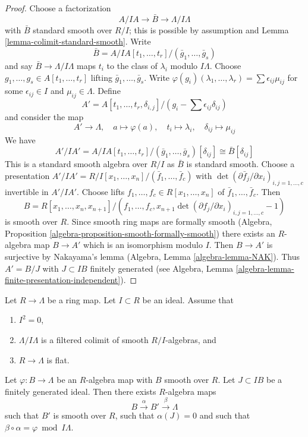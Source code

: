 \begin{proof}
Choose a factorization
$$
A/IA \to \bar B \to \Lambda/I\Lambda
$$
with $\bar B$ standard smooth over $R/I$; this is possible by
assumption and Lemma \ref{lemma-colimit-standard-smooth}. Write
$$
\bar B = A/IA[t_1, \ldots, t_r]/(\bar g_1, \ldots, \bar g_s)
$$
and say $\bar B \to \Lambda/I\Lambda$ maps $t_i$ to the class
of $\lambda_i$ modulo $I\Lambda$. Choose
$g_1, \ldots, g_s \in A[t_1, \ldots, t_r]$ lifting
$\bar g_1, \ldots, \bar g_s$. Write
$\varphi(g_i)(\lambda_1, \ldots, \lambda_r) =
\sum \epsilon_{ij} \mu_{ij}$
for some $\epsilon_{ij} \in I$ and $\mu_{ij} \in \Lambda$. Define
$$
A' = A[t_1, \ldots, t_r, \delta_{i, j}]/
(g_i - \sum \epsilon_{ij} \delta_{ij})
$$
and consider the map
$$
A' \longrightarrow \Lambda,\quad
a \longmapsto \varphi(a),\quad
t_i \longmapsto \lambda_i,\quad
\delta_{ij} \longmapsto \mu_{ij}
$$
We have
$$
A'/IA' = A/IA[t_1, \ldots, t_r]/(\bar g_1, \ldots, \bar g_s)[\delta_{ij}]
\cong \bar B[\delta_{ij}]
$$
This is a standard smooth algebra over $R/I$ as $\bar B$ is standard
smooth. Choose a presentation
$A'/IA' = R/I[x_1, \ldots, x_n]/(\bar f_1, \ldots, \bar f_c)$ with
$\det(\partial \bar f_j/\partial x_i)_{i, j = 1, \ldots, c}$ invertible in
$A'/IA'$. Choose lifts $f_1, \ldots, f_c \in R[x_1, \ldots, x_n]$ of
$\bar f_1, \ldots, \bar f_c$. Then
$$
B = R[x_1, \ldots, x_n, x_{n + 1}]/
(f_1, \ldots, f_c,
x_{n + 1}\det(\partial f_j/\partial x_i)_{i, j = 1, \ldots, c} - 1)
$$
is smooth over $R$. Since smooth ring maps are formally smooth
(Algebra, Proposition \ref{algebra-proposition-smooth-formally-smooth})
there exists an $R$-algebra map $B \to A'$ which is an isomorphism
modulo $I$. Then $B \to A'$ is surjective by Nakayama's lemma
(Algebra, Lemma \ref{algebra-lemma-NAK}).
Thus $A' = B/J$ with $J \subset IB$ finitely generated (see
Algebra, Lemma \ref{algebra-lemma-finite-presentation-independent}).
\end{proof}

\begin{lemma}
\label{lemma-lift-twice}
Let $R \to \Lambda$ be a ring map. Let $I \subset R$ be an ideal.
Assume that
\begin{enumerate}
\item $I^2 = 0$,
\item $\Lambda/I\Lambda$ is a filtered colimit of smooth $R/I$-algebras, and
\item $R \to \Lambda$ is flat.
\end{enumerate}
Let $\varphi : B \to \Lambda$ be an $R$-algebra map with $B$
smooth over $R$. Let $J \subset IB$ be a finitely generated ideal.
Then there exists $R$-algebra maps
$$
B \xrightarrow{\alpha} B' \xrightarrow{\beta} \Lambda
$$
such that $B'$ is smooth over $R$, such that $\alpha(J) = 0$ and
such that $\beta \circ \alpha = \varphi \bmod I\Lambda$.
\end{lemma}

